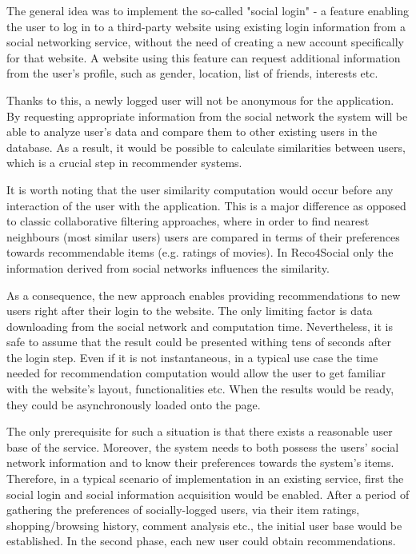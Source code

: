 \documentclass[12pt]{report}
\begin{document}
The general idea was to implement the so-called "social login" - \cite{social_login} a feature enabling the user to log in to a third-party website using existing login information from a social networking service, without the need of creating a new account specifically for that website. A website using this feature can request additional information from the user's profile, such as gender, location, list of friends, interests etc. 

Thanks to this, a newly logged user will not be anonymous for the application. By requesting appropriate information from the social network the system will be able to analyze user's data and compare them to other existing users in the database. As a result, it would be possible to calculate similarities between users, which is a crucial step in recommender systems.

It is worth noting that the user similarity computation would occur before any interaction of the user with the application. This is a major difference as opposed to classic collaborative filtering approaches, where in order to find nearest neighbours (most similar users) users are compared in terms of their preferences towards recommendable items (e.g. ratings of movies). In Reco4Social only the information derived from social networks influences the similarity.

As a consequence, the new approach enables providing recommendations to new users right after their login to the website. The only limiting factor is data downloading from the social network and computation time. Nevertheless, it is safe to assume that the result could be presented withing tens of seconds after the login step. Even if it is not instantaneous, in a typical use case the time needed for recommendation computation would allow the user to get familiar with the website's layout, functionalities etc. When the results would be ready, they could be asynchronously loaded onto the page. 

The only prerequisite for such a situation is that there exists a reasonable user base of the service. Moreover, the system needs to both possess the users' social network information and to know their preferences towards the system's items. Therefore, in a typical scenario of implementation in an existing service, first the social login and social information acquisition would be enabled. After a period of gathering the preferences of socially-logged users, via their item ratings, shopping/browsing history, comment analysis etc., the initial user base would be established. In the second phase, each new user could obtain recommendations. 
\end{document}
